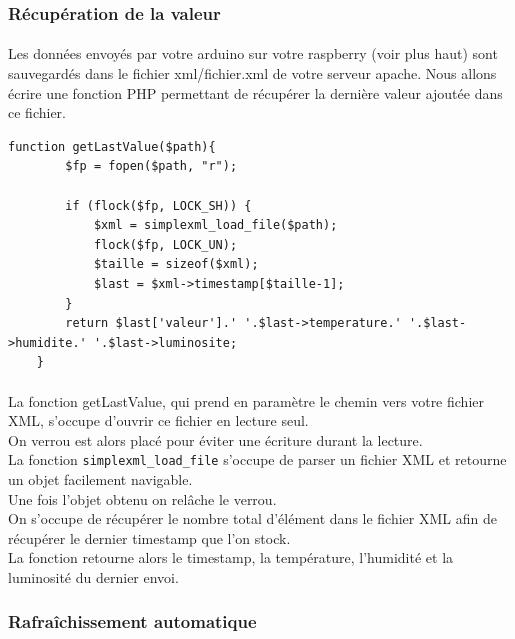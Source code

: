 \documentclass[a4paper, titlepage, oneside, 12pt]{article}%
\begin{document}
\subsubsection{Récupération de la valeur}
\paragraph{}
Les données envoyés par votre arduino sur votre raspberry (voir plus haut) sont sauvegardés dans le fichier xml/fichier.xml de votre serveur apache. Nous allons écrire une fonction PHP permettant de récupérer la dernière valeur ajoutée dans ce fichier.
\begin{lstlisting}
function getLastValue($path){
		$fp = fopen($path, "r");
		
		if (flock($fp, LOCK_SH)) {
			$xml = simplexml_load_file($path);
			flock($fp, LOCK_UN);
			$taille = sizeof($xml);
			$last = $xml->timestamp[$taille-1];	
		}
		return $last['valeur'].' '.$last->temperature.' '.$last->humidite.' '.$last->luminosite;
	}	
\end{lstlisting}
\paragraph{}
La fonction getLastValue, qui prend en paramètre le chemin vers votre fichier XML, s'occupe d'ouvrir ce fichier en lecture seul.\\
On verrou est alors placé pour éviter une écriture durant la lecture.\\
La fonction \texttt{simplexml\_load\_file} s'occupe de parser un fichier XML et retourne un objet facilement navigable.\\
Une fois l'objet obtenu on relâche le verrou. \\
On s'occupe de récupérer le nombre total d’élément dans le fichier XML afin de récupérer le dernier timestamp que l'on stock.\\
La fonction retourne alors le timestamp, la température, l'humidité et la luminosité du dernier envoi.\\

\subsubsection{Rafraîchissement automatique}
\end{document}
